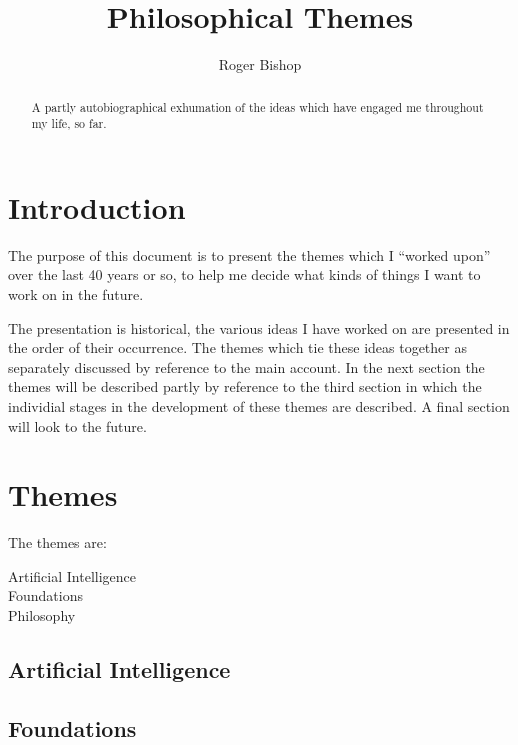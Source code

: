 \documentclass{rbjk}
\begin{document}
                                                                                   
\begin{article}
\begin{opening}  
\title{Philosophical Themes}
\author{Roger Bishop }

\begin{abstract}
A partly autobiographical exhumation of the ideas which have engaged me throughout my life, so far.
\end{abstract}
\end{opening}

\setcounter{tocdepth}{4}
{\parskip-0pt\tableofcontents}

\section{Introduction}

The purpose of this document is to present the themes which I ``worked upon'' over the last 40 years or so, to help me decide what kinds of things I want to work on in the future.

The presentation is historical, the various ideas I have worked on are presented in the order of their occurrence.
The themes which tie these ideas together as separately discussed by reference to the main account.
In the next section the themes will be described partly by reference to the third section in which the individial stages in the development of these themes are described.
A final section will look to the future.

\section{Themes}

The themes are:
\begin{description}
\item[Artificial Intelligence]
\item[Foundations]
\item[Philosophy]
\end{description}

\subsection{Artificial Intelligence}

\subsection{Foundations}


\end{article}
\end{document}
